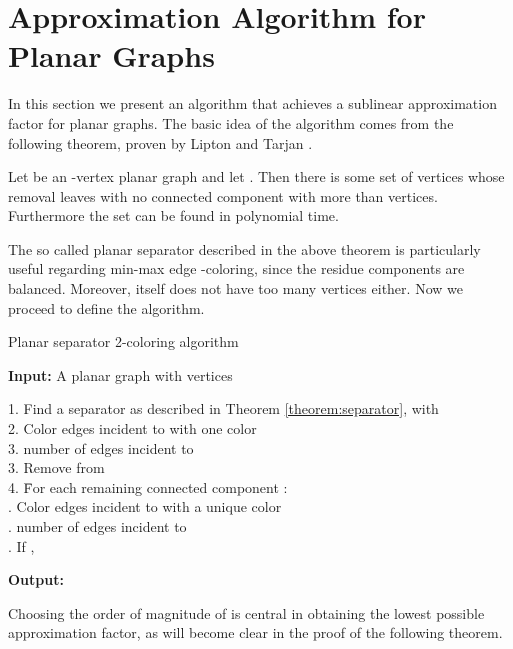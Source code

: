 \documentclass[runningheads, a4paper]{llncs}
\begin{document}
\section{Approximation Algorithm for Planar Graphs}\label{sect:separator}



In this section we present an algorithm that achieves a sublinear approximation factor for planar graphs. The basic idea of the algorithm comes from the following theorem, proven by Lipton and Tarjan \cite{Lipton1980}.

\begin{theorem}\label{theorem:separator}
Let  be an -vertex planar graph and let . Then there is some set  of  vertices whose removal leaves  with no connected component with more than  vertices. Furthermore the set  can be found in polynomial time.
\end{theorem}

The so called planar separator  described in the above theorem is particularly useful regarding min-max edge -coloring, since the residue components are balanced. Moreover,  itself does not have too many vertices either. Now we proceed to define the algorithm.

\begin{algorithm}[htb]
\caption{Planar separator 2-coloring algorithm}
\label{alg:separator}
\textbf{Input:} A planar graph  with  vertices
\begin{tabbing}
1. Find a separator  as described in Theorem \ref{theorem:separator}, with  \\
2. Color edges incident to  with one color \\
3.  number of edges incident to  \\
3. Remove  from  \\
4. \= For each remaining connected component : \\
   . Color edges incident to  with a unique color \\
   .  number of edges incident to  \\
   . If , 
\end{tabbing}
\textbf{Output:} 
\end{algorithm}

Choosing the order of magnitude of  is central in obtaining the lowest possible approximation factor, as will become clear in the proof of the following theorem.
\end{document}
